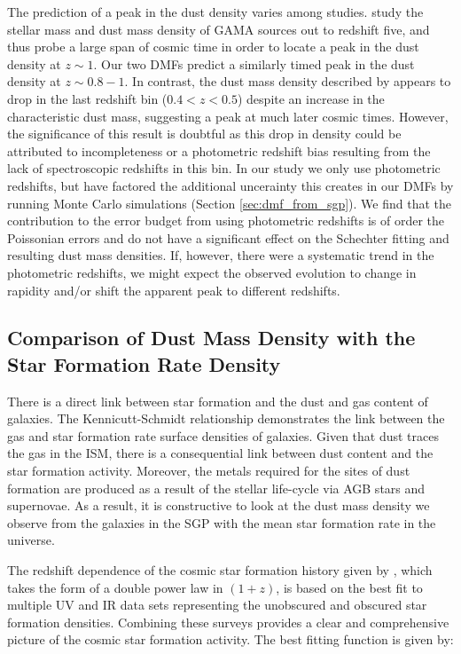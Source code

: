 The prediction of a peak in the dust density varies among studies. \citealt{Driver_2018} study the stellar mass and dust mass density of GAMA sources out to redshift five, and thus probe a large span of cosmic time in order to locate a peak in the dust density at $z \sim 1$. Our two DMFs predict a similarly timed peak in the dust density at $z \sim 0.8 - 1$. In contrast, the dust mass density described by \citealt{Dunne_2011} appears to drop in the last redshift bin ($0.4 < z < 0.5$) despite an increase in the characteristic dust mass, suggesting a peak at much later cosmic times. However, the significance of this result is doubtful as this drop in density could be attributed to incompleteness or a photometric redshift bias resulting from the lack of spectroscopic redshifts in this bin. In our study we only use photometric redshifts, but have factored the additional uncerainty this creates in our DMFs by running Monte Carlo simulations (Section \ref{sec:dmf_from_sgp}). We find that the contribution to the error budget from using photometric redshifts is of order the Poissonian errors and do not have a significant effect on the Schechter fitting and resulting dust mass densities. If, however, there were a systematic trend in the photometric redshifts, we might expect the observed evolution to change in rapidity and/or shift the apparent peak to different redshifts.

\subsection{Comparison of Dust Mass Density with the Star Formation Rate Density}

There is a direct link between star formation and the dust and gas content of galaxies. The Kennicutt-Schmidt relationship demonstrates the link between the gas and star formation rate surface densities of galaxies. Given that dust traces the gas in the ISM, there is a consequential link between dust content and the star formation activity. Moreover, the metals required for the sites of dust formation are produced as a result of the stellar life-cycle via AGB stars and supernovae. As a result, it is constructive to look at the dust mass density we observe from the galaxies in the SGP with the mean star formation rate in the universe.

The redshift dependence of the cosmic star formation history given by \citealt{Madau_2014}, which takes the form of a double power law in $(1 + z)$, is based on the best fit to multiple UV and IR data sets representing the unobscured and obscured star formation densities. Combining these surveys provides a clear and comprehensive picture of the cosmic star formation activity. The best fitting function is given by:

